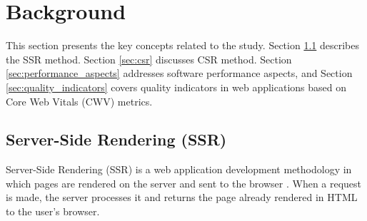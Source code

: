 \documentclass{sbc2019}%
\begin{document}

 
\section{Background}\label{sec:background}

This section presents the key concepts related to the study. Section \ref{sec:ssr} describes the SSR method. Section \ref{sec:csr} discusses CSR method. Section \ref{sec:performance_aspects} addresses software performance aspects, and Section \ref{sec:quality_indicators} covers quality indicators in web applications based on  Core Web Vitals (CWV) metrics.

\subsection{Server-Side Rendering (SSR)}
\label{sec:ssr}

Server-Side Rendering (SSR) is a web application development methodology in which pages are rendered on the server and sent to the browser \cite{clientServerSide:2020}. When a request is made, the server processes it and returns the page already rendered in HTML to the user's browser.

\end{document}
